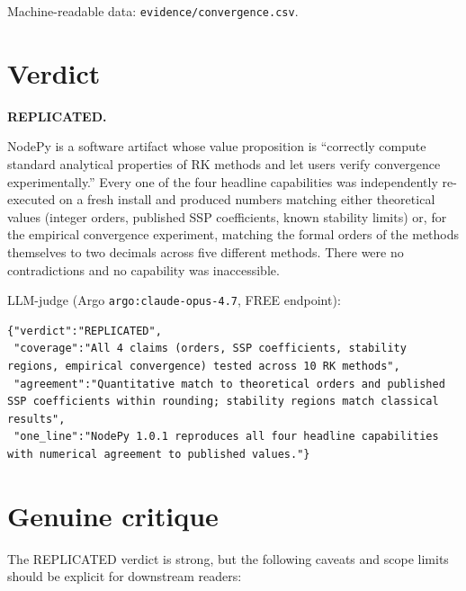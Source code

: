 \documentclass[11pt]{article}
\begin{document}
\medskip

Machine-readable data: \texttt{evidence/convergence.csv}.

\section{Verdict}

\textbf{REPLICATED.}

NodePy is a software artifact whose value proposition is ``correctly
compute standard analytical properties of RK methods and let users verify
convergence experimentally.'' Every one of the four headline capabilities
was independently re-executed on a fresh install and produced numbers
matching either theoretical values (integer orders, published SSP
coefficients, known stability limits) or, for the empirical convergence
experiment, matching the formal orders of the methods themselves to two
decimals across five different methods. There were no contradictions and
no capability was inaccessible.

LLM-judge (Argo \texttt{argo:claude-opus-4.7}, FREE endpoint):
\begin{lstlisting}
{"verdict":"REPLICATED",
 "coverage":"All 4 claims (orders, SSP coefficients, stability regions, empirical convergence) tested across 10 RK methods",
 "agreement":"Quantitative match to theoretical orders and published SSP coefficients within rounding; stability regions match classical results",
 "one_line":"NodePy 1.0.1 reproduces all four headline capabilities with numerical agreement to published values."}
\end{lstlisting}

\section{Genuine critique}

The REPLICATED verdict is strong, but the following caveats and scope
limits should be explicit for downstream readers:
\end{document}
